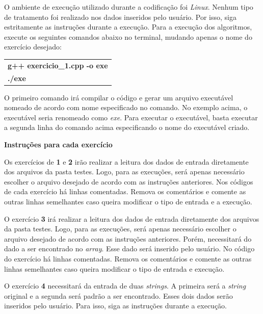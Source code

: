 \documentclass[12pt,a4paper]{article}
\begin{document}
O ambiente de execução utilizado durante a codificação foi \textit{Linux}. Nenhum tipo de tratamento foi realizado nos dados inseridos pelo usuário. Por isso, siga estritamente as instruções durante a execução. Para a execução dos algoritmos, execute os seguintes comandos abaixo no terminal, mudando apenas o nome do exercício desejado:

\begin{table}[H]
	\centering
	\begin{tabular}{|l|}
		\hline
		\textbf{g++ exercicio\_1.cpp -o exe}\\		
		\textbf{./exe}\\
		\hline
	\end{tabular}
\end{table}

O primeiro comando irá compilar o código e gerar um arquivo executável nomeado de acordo com nome especificado no comando. No exemplo acima, o executável seria renomeado como \textit{exe}. Para executar o executável, basta executar a segunda linha do comando acima especificando o nome do executável criado.

\newpage

{\Large \textbf{Instruções para cada exercício}}

\vspace{0.5cm}

Os exercícios de \textbf{1} e\textbf{ 2} irão realizar a leitura dos dados de entrada diretamente dos arquivos da pasta \textsf{testes}. Logo, para as execuções, será apenas necessário escolher o arquivo desejado de acordo com as instruções anteriores. Nos códigos de cada exercício há linhas comentadas. Remova os comentários e comente as outras linhas semelhantes caso queira modificar o tipo de entrada e a execução.

O exercício \textbf{3} irá realizar a leitura dos dados de entrada diretamente dos arquivos da pasta \textsf{testes}. Logo, para as execuções, será apenas necessário escolher o arquivo desejado de acordo com as instruções anteriores. Porém, necessitará do dado a ser encontrado no \textit{array}. Esse dado será inserido pelo usuário. No código do exercício há linhas comentadas. Remova os comentários e comente as outras linhas semelhantes caso queira modificar o tipo de entrada e execução. 

O exercício \textbf{4} necessitará da entrada de duas \textit{strings}. A primeira será a \textit{string} original e a segunda será padrão a ser encontrado. Esses dois dados serão inseridos pelo usuário. Para isso, siga as instruções durante a execução.
\end{document}
